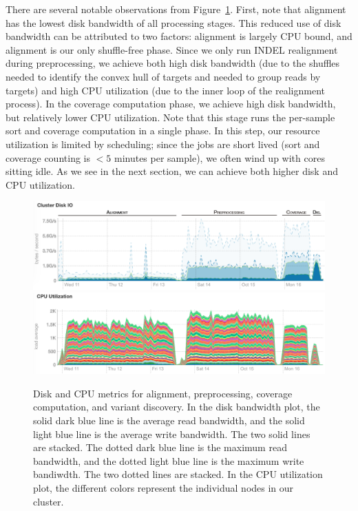 \documentclass[phd]{ucbthesis}
\begin{document}
There are several notable observations from Figure~\ref{fig:phase1}. First,
note that alignment has the lowest disk bandwidth of all processing stages.
This reduced use of disk bandwidth can be attributed to two
factors: alignment is largely CPU bound, and alignment is our only shuffle-free
phase. Since we only run INDEL realignment during preprocessing, we achieve both
high disk bandwidth (due to the shuffles needed to identify the convex hull of
targets and needed to group reads by targets) and high CPU utilization (due to
the inner loop of the realignment process). In the coverage computation phase,
we achieve high disk bandwidth, but relatively lower CPU utilization. Note that
this stage runs the per-sample sort and coverage computation in a single phase.
In this step, our resource utilization is limited by scheduling; since the jobs
are short lived (sort and coverage counting is $<5$ minutes per sample), we
often wind up with cores sitting idle. As we see in the next section, we can
achieve both higher disk and CPU utilization.

\begin{figure}[h]
  \begin{center}
    \includegraphics[width=0.95\linewidth]{graphs/phase1-disk.png}
    \includegraphics[width=0.95\linewidth]{graphs/phase1-cpu.png}
  \end{center}
  \caption{Disk and CPU metrics for alignment, preprocessing, coverage
    computation, and variant discovery. In the disk bandwidth plot, the
    solid dark blue line is the average read bandwidth, and the solid light blue
    line is the average write bandwidth. The two solid lines are stacked. The
    dotted dark blue line is the maximum read bandwidth, and the dotted light
    blue line is the maximum write bandiwdth. The two dotted lines are stacked.
    In the CPU utilization plot, the different colors represent the individual
    nodes in our cluster.}
  \label{fig:phase1}
\end{figure}
\end{document}
